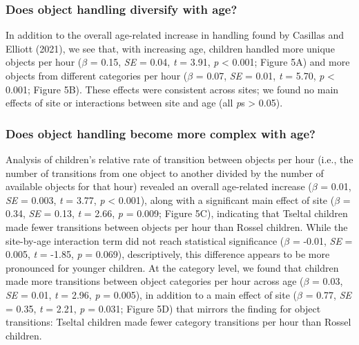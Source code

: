 \documentclass[10pt, letterpaper]{article}
\begin{document}
\hypertarget{does-object-handling-diversify-with-age}{%
\subsubsection{Does object handling diversify with
age?}\label{does-object-handling-diversify-with-age}}

In addition to the overall age-related increase in handling found by
Casillas and Elliott (2021), we see that, with increasing age, children
handled more unique objects per hour (\(\beta\) = 0.15, \emph{SE} =
0.04, \emph{t} = 3.91, \emph{p} \textless{} 0.001; Figure 5A) and more
objects from different categories per hour (\(\beta\) = 0.07, \emph{SE}
= 0.01, \emph{t} = 5.70, \emph{p} \textless{} 0.001; Figure 5B). These
effects were consistent across sites; we found no main effects of site
or interactions between site and age (all \emph{p}s \textgreater{}
0.05).\newline

\hypertarget{does-object-handling-become-more-complex-with-age}{%
\subsubsection{Does object handling become more complex with
age?}\label{does-object-handling-become-more-complex-with-age}}

Analysis of children's relative rate of transition between objects per
hour (i.e., the number of transitions from one object to another divided
by the number of available objects for that hour) revealed an overall
age-related increase (\(\beta\) = 0.01, \emph{SE} = 0.003, \emph{t} =
3.77, \emph{p} \textless{} 0.001), along with a significant main effect
of site (\(\beta\) = 0.34, \emph{SE} = 0.13, \emph{t} = 2.66, \emph{p} =
0.009; Figure 5C), indicating that Tseltal children made fewer
transitions between objects per hour than Rossel children. While the
site-by-age interaction term did not reach statistical significance
(\(\beta\) = -0.01, \emph{SE} = 0.005, \emph{t} = -1.85, \emph{p} =
0.069), descriptively, this difference appears to be more pronounced for
younger children. At the category level, we found that children made
more transitions between object categories per hour across age
(\(\beta\) = 0.03, \emph{SE} = 0.01, \emph{t} = 2.96, \emph{p} = 0.005),
in addition to a main effect of site (\(\beta\) = 0.77, \emph{SE} =
0.35, \emph{t} = 2.21, \emph{p} = 0.031; Figure 5D) that mirrors the
finding for object transitions: Tseltal children made fewer category
transitions per hour than Rossel children.
\end{document}
